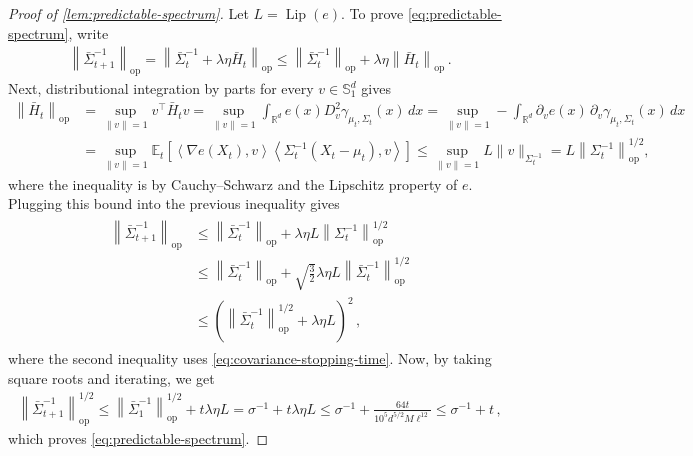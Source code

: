 \documentclass{article}
\newcommand{\R}{\mathbb R}
\newcommand{\E}{\mathbb E}
\newcommand{\Lip}{\operatorname{Lip}}
\newcommand{\op}{\mathrm{op}}
\newcommand{\1}{\mathbf 1}
\newcommand{\ip}[2]{\left\langle #1,#2\right\rangle}
\newcommand{\norm}[1]{\left\lVert #1\right\rVert}
\begin{document}
\begin{proof}[Proof of \cref{lem:predictable-spectrum}]
    Let $L=\Lip(e)$.
    To prove \eqref{eq:predictable-spectrum}, write
    \begin{align}
        \norm{\bar{\Sigma}_{t+1}^{-1}}_{\op}
        =
        \norm{\bar{\Sigma}_{t}^{-1} + \lambda\eta \bar{H}_t}_{\op}
        \leq
        \norm{\bar{\Sigma}_{t}^{-1}}_{\op} + \lambda\eta\norm{\bar{H}_t}_{\op}\,.
    \end{align}
    Next, distributional integration by parts for every $v\in\mathbb{S}_1^d$ gives
    \begin{align}
        \norm{\bar{H}_t}_{\op}
         & =
        \sup_{\|v\|=1} v^\top \bar{H}_t v
        =
        \sup_{\|v\|=1}
        \int_{\R^d}e(x) D^2_v\gamma_{\mu_t,\Sigma_t}(x)\,dx
        =
        \sup_{\|v\|=1}
        -\int_{\R^d}\partial_ve(x)\,
        \partial_v\gamma_{\mu_t,\Sigma_t}(x)\,dx
        \\
         & =
        \sup_{\|v\|=1}
        \E_t\left[
            \ip{\nabla e(X_t)}{v}
            \ip{\Sigma_t^{-1}(X_t-\mu_t)}{v}
            \right]
        \leq
        \sup_{\|v\|=1}
        L \|v\|_{\Sigma_t^{-1}}
        =
        L \norm{\Sigma_t^{-1}}_{\op}^{1/2},
        \label{eq:H-quadratic-bound}
    \end{align}
    where the inequality is by Cauchy--Schwarz and the Lipschitz property of $e$.
    Plugging this bound into the previous inequality gives
    \begin{align}
        \begin{aligned}
            \norm{\bar{\Sigma}_{t+1}^{-1}}_{\op}
             & \leq
            \norm{\bar{\Sigma}_{t}^{-1}}_{\op} + \lambda\eta L \norm{\Sigma_t^{-1}}_{\op}^{1/2}
            \\
             & \leq
            \norm{\bar{\Sigma}_{t}^{-1}}_{\op} + \sqrt{\frac{3}{2}}\lambda\eta L\norm{\bar{\Sigma}_{t}^{-1}}_{\op}^{1/2}
            \\
             & \leq
            \left(\norm{\bar{\Sigma}_{t}^{-1}}_{\op}^{1/2} + \lambda\eta L\right)^2\,,
        \end{aligned}
        \label{eq:predictable-spectrum-bound}
    \end{align}
    where the second inequality uses \eqref{eq:covariance-stopping-time}.
    Now, by taking square roots and iterating, we get
    \begin{align}
        \norm{\bar{\Sigma}_{t+1}^{-1}}_{\op}^{1/2}
        \leq
        \norm{\bar{\Sigma}_1^{-1}}_{\op}^{1/2} + t\lambda\eta L
        = \sigma^{-1}+t\lambda\eta L
        \leq
        \sigma^{-1}
        +\frac{64t}{10^5d^{5/2}M\ell^{12}}
        \leq
        \sigma^{-1} + t\,,
    \end{align}
    which proves \eqref{eq:predictable-spectrum}.
\end{proof}
\end{document}
